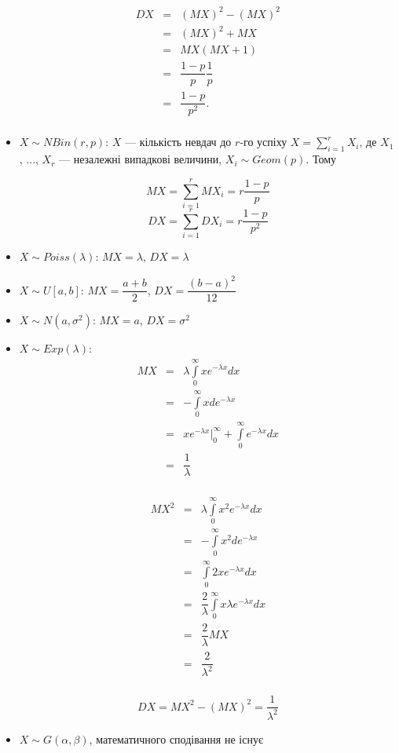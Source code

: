 \begin{itemize}
        $$\begin{array}{rcl}
            DX & = & (MX)^2 - (MX)^2 \\
            & = & (MX)^2 + MX \\
            & = & MX(MX + 1) \\
            & = & \dfrac{1-p}{p} \dfrac{1}{p} \\
            & = & \dfrac{1-p}{p^2}. \\
        \end{array}$$
    \item $X \sim NBin(r, p)$: $X$ --- кількість невдач до $r$-го успіху 
        $X = \sum\limits_{i=1}^{r} X_i$, де $X_1$, ..., $X_r$ --- незалежні
        випадкові величини, $X_i \sim Geom(p)$.
        Тому

        $$MX = \sum\limits_{i=1}^{r} MX_i = r \dfrac{1-p}{p}$$
        $$DX = \sum\limits_{i=1}^{r} DX_i = r \dfrac{1-p}{p^2}$$
    
    \item $X \sim Poiss(\lambda)$: $MX = \lambda$, $DX = \lambda$
    \item $X \sim U[a, b]$: $MX = \dfrac{a+b}{2}$, $DX = \dfrac{(b-a)^2}{12}$
    \item $X \sim N(a, \sigma^2)$: $MX = a$, $DX = \sigma^2$
    \item $X \sim Exp(\lambda)$:
        $$\begin{array}{rcl}
            MX & = & \lambda \int\limits_{0}^{\infty} x e^{-\lambda x} dx \\
            & = & - \int\limits_{0}^{\infty} x de^{-\lambda x} \\
            & = & x e^{-\lambda x} \Big|_0^{\infty} + \int\limits_{0}^{\infty} e^{-\lambda x} dx \\
            & = & \dfrac{1}{\lambda} \\
        \end{array}$$
        
        $$\begin{array}{rcl}
            MX^2 & = & \lambda \int\limits_{0}^{\infty} x^2 e^{-\lambda x} dx \\
            & = & - \int\limits_{0}^{\infty} x^2 de^{-\lambda x} \\
            & = & \int\limits_{0}^{\infty} 2 x e^{-\lambda x} dx \\
            & = & \dfrac{2}{\lambda} \int\limits_{0}^{\infty} x \lambda e^{-\lambda x} dx \\
            & = & \dfrac{2}{\lambda} MX \\
            & = & \dfrac{2}{\lambda^2} \\
        \end{array}$$
        
        $$DX = MX^2 - (MX)^2 = \dfrac{1}{\lambda^2}$$
    \item $X \sim G(\alpha, \beta)$, математичного сподівання не існує
\end{itemize}

